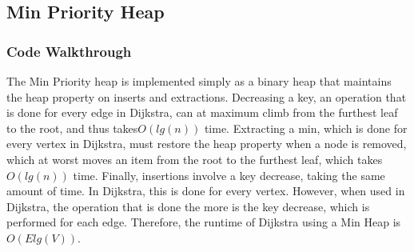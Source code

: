 \documentclass[a4paper,12pt]{article}
\begin{document}
\subsection{Min Priority Heap}
\subsubsection{Code Walkthrough}

The Min Priority heap is implemented simply as a binary heap that maintains the heap
property on inserts and extractions. Decreasing a key, an operation that is done for every edge in Dijkstra, can at maximum climb from the furthest leaf to the root, and thus takes$O(lg(n))$ time. Extracting a min, which is done for every vertex in Dijkstra, must restore the heap property when a node is removed, which at worst moves an item from the root to the furthest leaf, which takes $O(lg(n))$ time. Finally, insertions involve a key decrease, taking the same amount of time. In Dijkstra, this is done for every vertex. However, when used in Dijkstra, the operation that is done the more is the key decrease, which is performed for each edge. Therefore, the runtime of Dijkstra using a Min Heap is $O(Elg(V))$.
\end{document}
